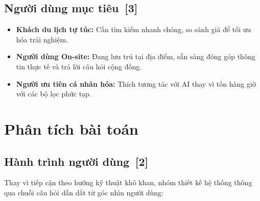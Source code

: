 \documentclass[12pt, a4paper]{article}
\begin{document}
\subsection[Người dùng mục tiêu]{Người dùng mục tiêu \,{\normalfont\small\textcolor{cyan!70!black}{[3]}}}
\begin{itemize}[label=\textcolor{cyan!70!black}{\faUserCheck}]
  \item \textbf{Khách du lịch tự túc:} Cần tìm kiếm nhanh chóng, so sánh giá để tối ưu hóa trải nghiệm.
  \item \textbf{Người dùng On-site:} Đang lưu trú tại địa điểm, sẵn sàng đóng góp thông tin thực tế và trả lời câu hỏi cộng đồng.
  \item \textbf{Người ưu tiên cá nhân hóa:} Thích tương tác với AI thay vì tốn hàng giờ với các bộ lọc phức tạp.
\end{itemize}


\section{Phân tích bài toán}

\subsection[Hành trình người dùng]{Hành trình người dùng \,{\normalfont\small\textcolor{cyan!70!black}{[2]}}}

Thay vì tiếp cận theo hướng kỹ thuật khô khan, nhóm thiết kế hệ thống thông qua chuỗi câu hỏi dẫn dắt từ góc nhìn người dùng:
\end{document}
